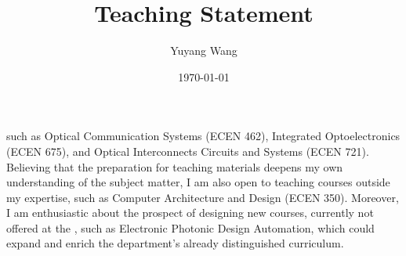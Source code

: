 



\title{Teaching Statement}

\def\courseOneName{Optical Communication Systems}
\def\courseOneNumber{ECEN 462}
\def\courseTwoName{Integrated Optoelectronics}
\def\courseTwoNumber{ECEN 675}
\def\courseThreeName{Optical Interconnects Circuits and Systems}
\def\courseThreeNumber{ECEN 721}
\def\courseFourName{Computer Architecture and Design}
\def\courseFourNumber{ECEN 350}
\def\courseSixName{Electronic Photonic Design Automation}

\def\rsCustom{%
such as \courseOneName{} (\courseOneNumber{}), \courseTwoName{} (\courseTwoNumber{}), and \courseThreeName{} (\courseThreeNumber{}). Believing that the preparation for teaching materials deepens my own understanding of the subject matter, I am also open to teaching courses outside my expertise, such as \courseFourName{} (\courseFourNumber{}). Moreover, I am enthusiastic about the prospect of designing new courses, currently not offered at the \appSchool{}, such as \courseSixName{}, which could expand and enrich the department's already distinguished curriculum.
}

\author{Yuyang Wang}
\date{\today}
\makeatletter
\fancyfoot[L]{\scshape \MakeLowercase{\@author}}
\fancyfoot[R]{{\scshape \MakeLowercase{\@title}}\quad{\LARGE\sfrac{\thepage}{\pageref*{LastPage}}}}
\makeatother



\maketitle%
\thispagestyle{fancy}


\rsCustom{}


\footnotesize


